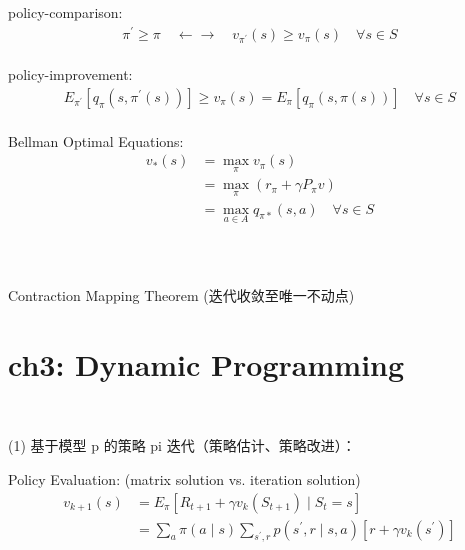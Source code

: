 \documentclass{article}
\begin{document}
\newpage


policy-comparison: 
\begin{align*}
    \pi^{\prime} \geq \pi 
    \quad \leftarrow \rightarrow \quad 
    v_{\pi^{\prime}}(s) \geq v_{\pi}(s) 
    \quad \forall s \in S
\end{align*}
\\[3pt]


policy-improvement: 
\begin{align*}
    E_{\pi^{\prime}} 
    \left[ q_{\pi} \left( s, \pi^{\prime}(s) \right) \right] 
    \geq v_{\pi}(s) 
    = E_{\pi} \left[ q_{\pi} \left( s, \pi(s) \right) \right] 
    \quad \forall s \in S
\end{align*}
\\[3pt]


Bellman Optimal Equations: 
\begin{align*}
    v_{*}(s) 
    & = \max_{\pi} v_{\pi}(s) \\[3pt]
    & = \max_{\pi} \left( r_{\pi} + \gamma P_{\pi} v \right) \\[3pt]
    & = \max_{a \in A} q_{\pi *}(s, a) \quad \forall s \in S \\[3pt]
\end{align*}
\\[3pt]


~ \\[3pt]
\begin{CJK}{UTF8}{gbsn}
    Contraction Mapping Theorem (迭代收敛至唯一不动点) \\[3pt]
\end{CJK}


\newpage
\section*{ch3: Dynamic Programming}


~ \\[3pt]
\begin{CJK}{UTF8}{gbsn}
    (1) 基于模型 p 的策略 pi 迭代（策略估计、策略改进）： \\[3pt]
\end{CJK}


Policy Evaluation: (matrix solution vs. iteration solution)
\begin{align*}
    v_{k+1}(s) 
    &= {E}_{\pi} \left[ R_{t+1}+\gamma 
    v_{k} \left( S_{t+1} \right) \mid S_{t}=s \right] \\
    &= \sum_{a} \pi(a \mid s) \sum_{s^{\prime}, r} 
    p \left( s^{\prime}, r \mid s, a \right) 
    \left[ r+\gamma v_{k} \left( s^{\prime} \right) \right]
\end{align*}
\\[3pt]
\end{document}
